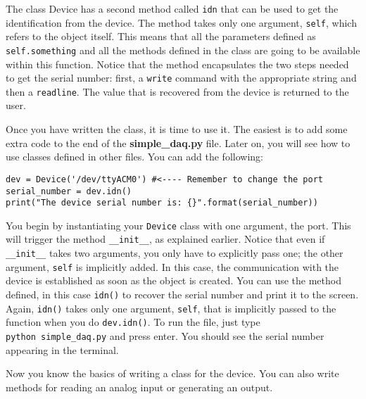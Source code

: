 The class Device has a second method called \texttt{idn} that can be
used to get the identification from the device. The method takes only
one argument, \texttt{self}, which refers to the object itself. This
means that all the parameters defined as \texttt{self.something} and all
the methods defined in the class are going to be available within this
function. Notice that the method encapsulates the two steps needed to
get the serial number: first, a \texttt{write} command with the
appropriate string and then a \texttt{readline}. The value that is
recovered from the device is returned to the user.

Once you have written the class, it is time to use it. The easiest is to
add some extra code to the end of the \textbf{simple\_daq.py} file.
Later on, you will see how to use classes defined in other files. You
can add the following:

\begin{verbatim}
dev = Device('/dev/ttyACM0') #<---- Remember to change the port
serial_number = dev.idn()
print("The device serial number is: {}".format(serial_number))
\end{verbatim}

You begin by instantiating your \texttt{Device} class with one argument,
the port. This will trigger the method \texttt{\_\_init\_\_}, as
explained earlier. Notice that even if \texttt{\_\_init\_\_} takes two
arguments, you only have to explicitly pass one; the other argument,
\texttt{self} is implicitly added. In this case, the communication with
the device is established as soon as the object is created. You can use
the method defined, in this case \texttt{idn()} to recover the serial
number and print it to the screen. Again, \texttt{idn()} takes only one
argument, \texttt{self}, that is implicitly passed to the function when
you do \texttt{dev.idn()}. To run the file, just type
\texttt{python\ simple\_daq.py} and press enter. You should see the
serial number appearing in the terminal.

Now you know the basics of writing a class for the device. You can also
write methods for reading an analog input or generating an output.



